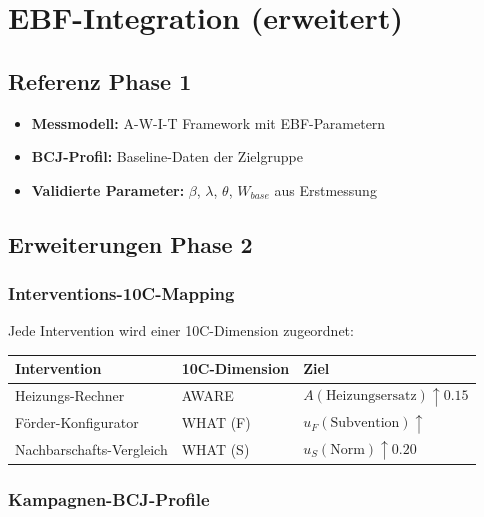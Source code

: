 \documentclass[11pt,a4paper]{article}
\begin{document}
\newpage

\section{EBF-Integration (erweitert)}

\subsection{Referenz Phase 1}

\begin{tcolorbox}[infobox={EBF-Grundlagen aus Phase 1}]
\begin{itemize}[leftmargin=*]
    \item \textbf{Messmodell:} A-W-I-T Framework mit EBF-Parametern
    \item \textbf{BCJ-Profil:} Baseline-Daten der Zielgruppe
    \item \textbf{Validierte Parameter:} $\beta$, $\lambda$, $\theta$, $W_{base}$ aus Erstmessung
\end{itemize}
\end{tcolorbox}

\subsection{Erweiterungen Phase 2}

\subsubsection{Interventions-10C-Mapping}

Jede Intervention wird einer 10C-Dimension zugeordnet:

\begin{tabular}{l l l}
\toprule
\textbf{Intervention} & \textbf{10C-Dimension} & \textbf{Ziel}\\
\midrule
\rowcolor{falightgray}
Heizungs-Rechner & AWARE & $A(\text{Heizungsersatz}) \uparrow 0.15$\\
Förder-Konfigurator & WHAT (F) & $u_F(\text{Subvention}) \uparrow$\\
\rowcolor{falightgray}
Nachbarschafts-Vergleich & WHAT (S) & $u_S(\text{Norm}) \uparrow 0.20$\\
\bottomrule
\end{tabular}

\subsubsection{Kampagnen-BCJ-Profile}
\end{document}
